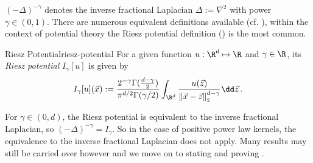 $(-\Delta)^{-\gamma}$ denotes the inverse fractional Laplacian $\Delta := \nabla^2$ with power $\gamma \in (0, 1)$.
There are numerous equivalent definitions available (cf. \cite{2015-fractional-laplacian-definitions}), within the context of potential theory the Riesz potential definition () is the most common.

\begin{definition}{Riesz Potential}{riesz-potential}
  For a given function $u: \R^d \mapsto \R$ and $\gamma \in \R$, its \textit{Riesz potential} $I_{\gamma}[u]$ is given by
  $$I_{\gamma}[u](\vec{x}) := \frac{2^{-\gamma} \Gamma(\tfrac{d-\gamma}{2})}{\pi^{d/2} \Gamma(\gamma/2)} \int_{\R^d} \frac{u(\vec{z})}{\norm{\vec{x}-\vec{z}}^{d-\gamma}} \dd\vec{z}\,.$$
\end{definition}

For $\gamma \in (0, d)$, the Riesz potential is equivalent to the inverse fractional Laplacian, so $(-\Delta)^{-\gamma} = I_\gamma$.
So in the case of positive power law kernels, the equivalence to the inverse fractional Laplacian does not apply.
Many results may still be carried over however and we move on to stating and proving .
